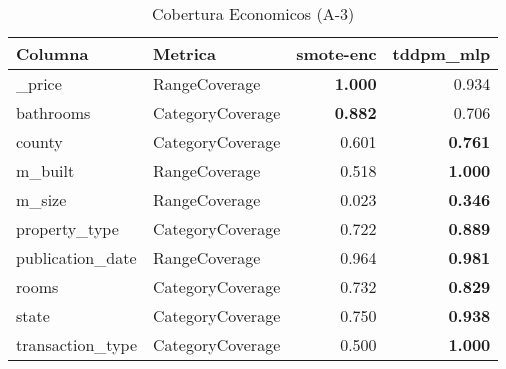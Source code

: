 \begin{table}[H]
\centering
\caption{Cobertura Economicos (A-3)}
\label{table-coverage-economicos-a-3}
\begin{tabular}{|l|l|r|r|}
\hline
\rowcolor[gray]{0.8}
Columna & Metrica & smote-enc & tddpm\_mlp \\
\hline \_price & RangeCoverage & \bfseries 1.000 & 0.934 \\
\hline bathrooms & CategoryCoverage & \bfseries 0.882 & 0.706 \\
\hline county & CategoryCoverage & 0.601 & \bfseries 0.761 \\
\hline m\_built & RangeCoverage & 0.518 & \bfseries 1.000 \\
\hline m\_size & RangeCoverage & 0.023 & \bfseries 0.346 \\
\hline property\_type & CategoryCoverage & 0.722 & \bfseries 0.889 \\
\hline publication\_date & RangeCoverage & 0.964 & \bfseries 0.981 \\
\hline rooms & CategoryCoverage & 0.732 & \bfseries 0.829 \\
\hline state & CategoryCoverage & 0.750 & \bfseries 0.938 \\
\hline transaction\_type & CategoryCoverage & 0.500 & \bfseries 1.000 \\
\hline
\end{tabular}
\end{table}
